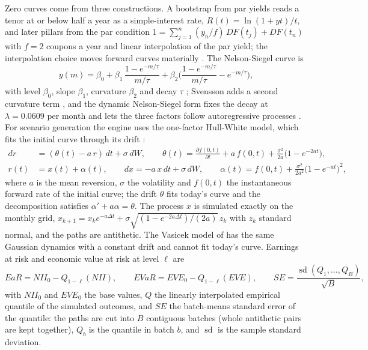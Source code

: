 Zero curves come from three constructions. A bootstrap from par yields reads a tenor at or below half a year as a simple-interest rate, $R(t)=\ln(1+yt)/t$, and later pillars from the par condition $1=\sum_{j=1}^{n}(y_n/f)\,DF(t_j)+DF(t_n)$ with $f=2$ coupons a year and linear interpolation of the par yield; the interpolation choice moves forward curves materially \citep{alm:hagan2006}. The Nelson-Siegel curve is
\begin{equation}
y(m)=\beta_0+\beta_1\,\frac{1-e^{-m/\tau}}{m/\tau}+\beta_2\Big(\frac{1-e^{-m/\tau}}{m/\tau}-e^{-m/\tau}\Big),
\label{eq:alm-ns}
\end{equation}
with level $\beta_0$, slope $\beta_1$, curvature $\beta_2$ and decay $\tau$ \citep{alm:nelson1987}; Svensson adds a second curvature term \citep{alm:svensson1994}, and the dynamic Nelson-Siegel form fixes the decay at $\lambda=0.0609$ per month and lets the three factors follow autoregressive processes \citep{alm:diebold2006}. For scenario generation the engine uses the one-factor Hull-White model, which fits the initial curve through its drift \citep{ccr:hullwhite1990}:
\begin{align}
dr&=(\theta(t)-a\,r)\,dt+\sigma\,dW,\qquad \theta(t)=\frac{\partial f(0,t)}{\partial t}+a\,f(0,t)+\frac{\sigma^{2}}{2a}\big(1-e^{-2at}\big),\label{eq:alm-hw}\\
r(t)&=x(t)+\alpha(t),\qquad dx=-a\,x\,dt+\sigma\,dW,\qquad \alpha(t)=f(0,t)+\frac{\sigma^{2}}{2a^{2}}\big(1-e^{-at}\big)^{2},\label{eq:alm-alpha}
\end{align}
where $a$ is the mean reversion, $\sigma$ the volatility and $f(0,t)$ the instantaneous forward rate of the initial curve; the drift $\theta$ fits today's curve and the decomposition satisfies $\alpha'+a\alpha=\theta$. The process $x$ is simulated exactly on the monthly grid, $x_{k+1}=x_k e^{-a\Delta t}+\sigma\sqrt{(1-e^{-2a\Delta t})/(2a)}\,z_k$ with $z_k$ standard normal, and the paths are antithetic. The Vasicek model of \citet{alm:vasicek1977} has the same Gaussian dynamics with a constant drift and cannot fit today's curve. Earnings at risk and economic value at risk at level $\ell$ are
\begin{equation}
EaR=NII_0-Q_{1-\ell}(NII),\qquad EVaR=EVE_0-Q_{1-\ell}(EVE),\qquad SE=\frac{\operatorname{sd}(Q_1,\dots,Q_B)}{\sqrt B},
\label{eq:alm-ear}
\end{equation}
with $NII_0$ and $EVE_0$ the base values, $Q$ the linearly interpolated empirical quantile of the simulated outcomes, and $SE$ the batch-means standard error of the quantile: the paths are cut into $B$ contiguous batches (whole antithetic pairs are kept together), $Q_b$ is the quantile in batch $b$, and $\operatorname{sd}$ is the sample standard deviation.

